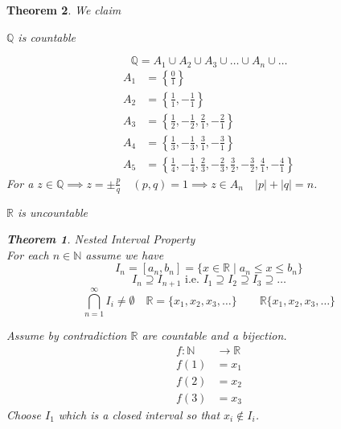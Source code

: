 \documentclass[letterpaper, 12pt]{article}
\newtheorem{theorem}{Theorem}[section]
\newenvironment{proof}[1][Proof]{\begin{trivlist}
\item[\hskip \labelsep {\bfseries #1}]}{\end{trivlist}}
\newcommand{\naturals}{\mathbb{N}}
\newcommand{\rationals}{\mathbb{Q}}
\newcommand{\reals}{\mathbb{R}}
\begin{document}
    \begin{theorem}
        We claim \begin{enumerate}
        \item $\rationals$ is countable
        \begin{proof}
            \[\rationals = A_1 \cup A_2 \cup A_3 \cup \dots \cup A_n \cup \dots\]
            \begin{align*}
                A_1 &= \left\{\frac{0}{1}\right\} \\
                A_2 &= \left\{\frac{1}{1}, -\frac{1}{1}\right\} \\
                A_3 &= \left\{\frac{1}{2}, -\frac{1}{2}, \frac{2}{1}, -\frac{2}{1}\right\} \\
                A_4 &= \left\{\frac{1}{3}, -\frac{1}{3}, \frac{3}{1}, -\frac{3}{1}\right\} \\
                A_5 &= \left\{\frac{1}{4}, -\frac{1}{4}, \frac{2}{3}, -\frac{2}{3}, 
                \frac{3}{2}, -\frac{3}{2}, \frac{4}{1}, -\frac{4}{1}\right\}
            \end{align*}
            For a $z \in \rationals \implies z = \pm \frac{p}{q} \quad (p, q) = 1 
            \implies z \in A_n \quad |p| + |q| = n$.
        \end{proof}
        \item $\reals$ is uncountable
        \begin{theorem}
            Nested Interval Property \\
            For each $n \in \naturals$ assume we have
            \[I_n = [a_n, b_n] = \{x \in \reals \mid a_n \le x \le b_n\}\]
            \[I_n \supseteq I_{n+1} \text{ i.e. } I_1 \supseteq I_2 \supseteq I_3 \supseteq \dots\]
            \[\bigcap_{n=1}^\infty I_i \ne \emptyset \quad \reals = \{x_1, x_2, x_3, \dots\}
            \qquad \reals \{x_1, x_2, x_3, \dots\}\]
        \end{theorem}
        \begin{proof}
            Assume by contradiction $\reals$ are countable and a bijection.
            \begin{align*}
                f: \naturals &\rightarrow \reals \\
                f(1) &= x_1 \\
                f(2) &= x_2 \\
                f(3) &= x_3
            \end{align*}
            Choose $I_1$ which is a closed interval so that $x_i \notin I_i$.
            \begin{enumerate}

\end{enumerate}
\end{proof}
\end{enumerate}
\end{theorem}
\end{document}

